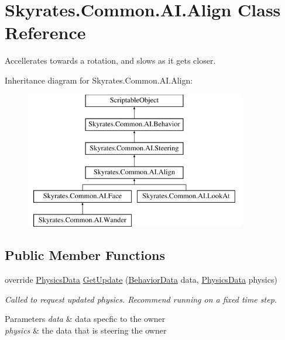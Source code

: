 \hypertarget{class_skyrates_1_1_common_1_1_a_i_1_1_align}{\section{Skyrates.\-Common.\-A\-I.\-Align Class Reference}
\label{class_skyrates_1_1_common_1_1_a_i_1_1_align}
}


Accellerates towards a rotation, and slows as it gets closer.  


Inheritance diagram for Skyrates.\-Common.\-A\-I.\-Align\-:\begin{figure}[H]
\begin{center}
\leavevmode
\includegraphics[height=6.000000cm]{class_skyrates_1_1_common_1_1_a_i_1_1_align}
\end{center}
\end{figure}
\subsection*{Public Member Functions}
\begin{DoxyCompactItemize}
\item 
\hypertarget{class_skyrates_1_1_common_1_1_a_i_1_1_align_ad95542a8aac851265c68724012d5f4d4}{override \hyperlink{class_skyrates_1_1_common_1_1_a_i_1_1_physics_data}{Physics\-Data} \hyperlink{class_skyrates_1_1_common_1_1_a_i_1_1_align_ad95542a8aac851265c68724012d5f4d4}{Get\-Update} (\hyperlink{class_skyrates_1_1_common_1_1_a_i_1_1_behavior_data}{Behavior\-Data} data, \hyperlink{class_skyrates_1_1_common_1_1_a_i_1_1_physics_data}{Physics\-Data} physics)}\label{class_skyrates_1_1_common_1_1_a_i_1_1_align_ad95542a8aac851265c68724012d5f4d4}

\begin{DoxyCompactList}\small\item\em Called to request updated physics. Recommend running on a fixed time step. 


\begin{DoxyParams}{Parameters}
{\em data} & data specfic to the owner\\
\hline
{\em physics} & the data that is steering the owner\\
\hline
\end{DoxyParams}
 \end{DoxyCompactList}\end{DoxyCompactItemize}

